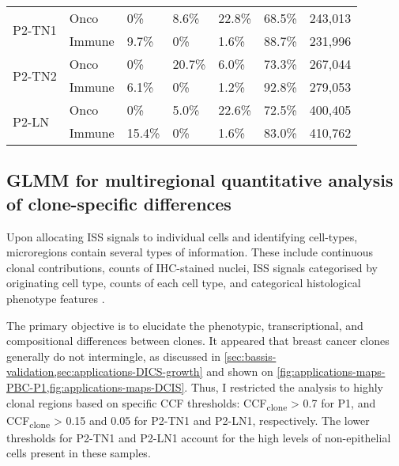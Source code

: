 {\begin{longtable}{l l l l l l l}
    \multirow{2}{*}{P2-TN1} & Onco & 0\% & 8.6\% & 22.8\% & 68.5\% & 243,013 \\
                         & Immune & 9.7\% & 0\% & 1.6\% & 88.7\% & 231,996 \\
    \multirow{2}{*}{P2-TN2} & Onco & 0\% & 20.7\% & 6.0\% & 73.3\% & 267,044 \\
                         & Immune & 6.1\% & 0\% & 1.2\% & 92.8\% & 279,053 \\
    \multirow{2}{*}{P2-LN}  & Onco & 0\% & 5.0\% & 22.6\% & 72.5\% & 400,405 \\
                         & Immune & 15.4\% & 0\% & 1.6\% & 83.0\% & 410,762 \\
    \bottomrule
\end{longtable}
}

\subsection{\acs{GLMM} for multiregional quantitative analysis of clone-specific differences}
\label{sec:modalities-glmm}

Upon allocating \ac{ISS} signals to individual cells and identifying cell-types, microregions contain several types of information. These include continuous clonal contributions, counts of \ac{IHC}-stained nuclei, \ac{ISS} signals categorised by originating cell type, counts of each cell type, and categorical histological phenotype features .


The primary objective is to elucidate the phenotypic, transcriptional, and compositional differences between clones. It appeared that breast cancer clones generally do not intermingle, as discussed in \cref{sec:bassis-validation,sec:applications-DICS-growth} and shown on \cref{fig:applications-maps-PBC-P1,fig:applications-maps-DCIS}. Thus, I restricted the analysis to highly clonal regions based on specific \ac{CCF} thresholds: \ac{CCF}\textsubscript{clone} > 0.7 for P1, and \ac{CCF}\textsubscript{clone} > 0.15 and 0.05 for P2-TN1 and P2-LN1, respectively. The lower thresholds for P2-TN1 and P2-LN1 account for the high levels of non-epithelial cells present in these samples.

